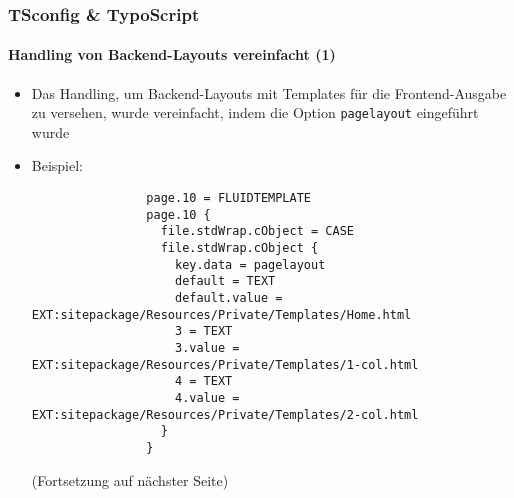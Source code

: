 
\begin{frame}[fragile]
	\frametitle{TSconfig \& TypoScript}
	\framesubtitle{Handling von Backend-Layouts vereinfacht (1)}

	\lstset{basicstyle=\tiny\ttfamily}

	\begin{itemize}

		\item Das Handling, um Backend-Layouts mit Templates für die Frontend-Ausgabe zu versehen,
			wurde vereinfacht, indem die Option \texttt{pagelayout} eingeführt wurde

		\item Beispiel:

			\begin{lstlisting}
				page.10 = FLUIDTEMPLATE
				page.10 {
				  file.stdWrap.cObject = CASE
				  file.stdWrap.cObject {
				    key.data = pagelayout
				    default = TEXT
				    default.value = EXT:sitepackage/Resources/Private/Templates/Home.html
				    3 = TEXT
				    3.value = EXT:sitepackage/Resources/Private/Templates/1-col.html
				    4 = TEXT
				    4.value = EXT:sitepackage/Resources/Private/Templates/2-col.html
				  }
				}
			\end{lstlisting}

			\smaller
				(Fortsetzung auf nächster Seite)
			\normalsize

	\end{itemize}

\end{frame}


